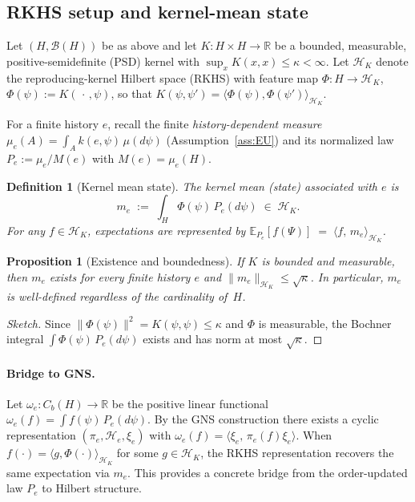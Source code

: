 \documentclass[12pt,a4paper]{article}
\newtheorem{definition}{Definition}
\newtheorem{proposition}{Proposition}
\begin{document}
\subsection{RKHS setup and kernel-mean state}\label{subsec:rkhs}

Let $(H,\mathcal B(H))$ be as above and let $K:H\times H\to\mathbb R$ be a bounded,
measurable, positive-semidefinite (PSD) kernel with $\sup_{x} K(x,x)\le \kappa<\infty$.
Let $\mathcal H_K$ denote the reproducing-kernel Hilbert space (RKHS) with feature map
$\Phi:H\to\mathcal H_K$, $\Phi(\psi):=K(\,\cdot\,,\psi)$, so that
$K(\psi,\psi')=\langle \Phi(\psi),\Phi(\psi')\rangle_{\mathcal H_K}$.

For a finite history $e$, recall the finite \emph{history-dependent measure}
$\mu_e(A)=\int_A k(e,\psi)\,\mu(d\psi)$ (Assumption~\ref{ass:EU}) and its normalized law
$P_e:=\mu_e/M(e)$ with $M(e)=\mu_e(H)$.

\begin{definition}[Kernel mean state]\label{def:kernel-mean-state}
The \emph{kernel mean} (state) associated with $e$ is
\begin{equation}
  m_e \;:=\; \int_H \Phi(\psi)\,P_e(d\psi) \;\in\; \mathcal H_K.
\end{equation}
For any $f\in\mathcal H_K$, expectations are represented by
$\mathbb E_{P_e}[f(\Psi)] \;=\; \langle f,\, m_e\rangle_{\mathcal H_K}$.
\end{definition}

\begin{proposition}[Existence and boundedness]\label{prop:kme_exists}
If $K$ is bounded and measurable, then $m_e$ exists for every finite history $e$ and
$\|m_e\|_{\mathcal H_K}\le \sqrt{\kappa}$. In particular, $m_e$ is well-defined regardless of the cardinality of~$H$.
\end{proposition}

\begin{proof}[Sketch]
Since $\|\Phi(\psi)\|^2=K(\psi,\psi)\le \kappa$ and $\Phi$ is measurable, the Bochner integral
$\int \Phi(\psi)\,P_e(d\psi)$ exists and has norm at most $\sqrt{\kappa}$.
\end{proof}

\paragraph{Bridge to GNS.}
Let $\omega_e:C_b(H)\to\mathbb R$ be the positive linear functional $\omega_e(f)=\int f(\psi)\,P_e(d\psi)$.
By the GNS construction there exists a cyclic representation $(\pi_e,\mathcal H_e,\xi_e)$ with
$\omega_e(f)=\langle \xi_e,\,\pi_e(f)\xi_e\rangle$. When $f(\cdot)=\langle g,\Phi(\cdot)\rangle_{\mathcal H_K}$
for some $g\in\mathcal H_K$, the RKHS representation recovers the same expectation via $m_e$.
This provides a concrete bridge from the order-updated law $P_e$ to Hilbert structure.
\end{document}
